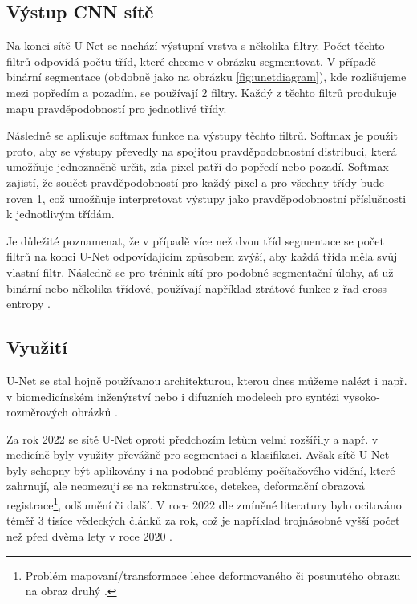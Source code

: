 \subsection{Výstup CNN sítě}
\label{subsec:Chapter222}

Na konci sítě U-Net se nachází výstupní vrstva s několika filtry. Počet těchto filtrů odpovídá počtu tříd, které chceme v obrázku segmentovat. V případě binární segmentace (obdobně jako na obrázku \ref{fig:unetdiagram}), kde rozlišujeme mezi popředím a pozadím, se používají 2 filtry. Každý z těchto filtrů produkuje mapu pravděpodobností pro jednotlivé třídy.

Následně se aplikuje softmax funkce na výstupy těchto filtrů. Softmax je použit proto, aby se výstupy převedly na spojitou pravděpodobnostní distribuci, která umožňuje jednoznačně určit, zda pixel patří do popředí nebo pozadí. Softmax zajistí, že součet pravděpodobností pro každý pixel a pro všechny třídy bude roven 1, což umožňuje interpretovat výstupy jako pravděpodobnostní příslušnosti k jednotlivým třídám.

Je důležité poznamenat, že v případě více než dvou tříd segmentace se počet filtrů na konci U-Net odpovídajícím způsobem zvýší, aby každá třída měla svůj vlastní filtr. Následně se pro trénink sítí pro podobné segmentační úlohy, ať už binární nebo několika třídové, používají například ztrátové funkce z řad cross-entropy \cite{unet}.

\subsection{Využití}
\label{subsec:Chapter223}

U-Net se stal hojně používanou architekturou, kterou dnes můžeme nalézt i např. v biomedicínském inženýrství \cite{unet_success} nebo i difuzních modelech pro syntézi vysoko-rozměrových obrázků \cite{stablediffusion}.

Za rok 2022 se sítě U-Net oproti předchozím letům velmi rozšířily a např. v medicíně byly využity převážně pro segmentaci a klasifikaci. Avšak sítě U-Net byly schopny být aplikovány i na podobné problémy počítačového vidění, které zahrnují, ale neomezují se na rekonstrukce, detekce, deformační obrazová registrace\footnote{Problém mapovaní/transformace lehce deformovaného či posunutého obrazu na obraz druhý \cite{unet_registration}.}, odšumění či další. V roce 2022 dle zmíněné literatury bylo ocitováno téměř 3 tisíce vědeckých článků za rok, což je například trojnásobně vyšší počet než před dvěma lety v roce 2020 \cite{unet_success}.

\endinput